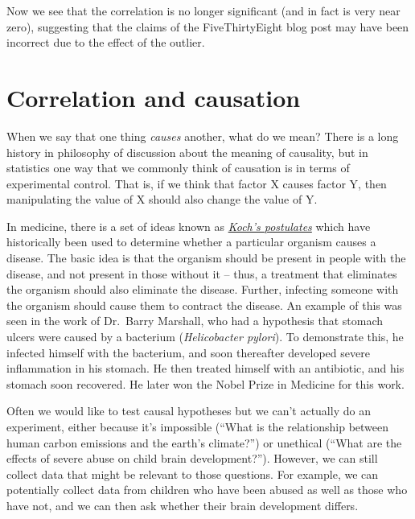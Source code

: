 \documentclass[12pt,]{book}
\theoremstyle{definition}
\theoremstyle{definition}
\theoremstyle{definition}
\theoremstyle{remark}
\begin{document}
Now we see that the correlation is no longer significant (and in fact is very near zero), suggesting that the claims of the FiveThirtyEight blog post may have been incorrect due to the effect of the outlier.

\hypertarget{correlation-and-causation}{%
\section{Correlation and causation}\label{correlation-and-causation}}

When we say that one thing \emph{causes} another, what do we mean? There is a long history in philosophy of discussion about the meaning of causality, but in statistics one way that we commonly think of causation is in terms of experimental control. That is, if we think that factor X causes factor Y, then manipulating the value of X should also change the value of Y.

In medicine, there is a set of ideas known as \href{https://en.wikipedia.org/wiki/Koch\%27s_postulates}{\emph{Koch's postulates}} which have historically been used to determine whether a particular organism causes a disease. The basic idea is that the organism should be present in people with the disease, and not present in those without it -- thus, a treatment that eliminates the organism should also eliminate the disease. Further, infecting someone with the organism should cause them to contract the disease. An example of this was seen in the work of Dr.~Barry Marshall, who had a hypothesis that stomach ulcers were caused by a bacterium (\emph{Helicobacter pylori}). To demonstrate this, he infected himself with the bacterium, and soon thereafter developed severe inflammation in his stomach. He then treated himself with an antibiotic, and his stomach soon recovered. He later won the Nobel Prize in Medicine for this work.

Often we would like to test causal hypotheses but we can't actually do an experiment, either because it's impossible (``What is the relationship between human carbon emissions and the earth's climate?'') or unethical (``What are the effects of severe abuse on child brain development?''). However, we can still collect data that might be relevant to those questions. For example, we can potentially collect data from children who have been abused as well as those who have not, and we can then ask whether their brain development differs.
\end{document}

